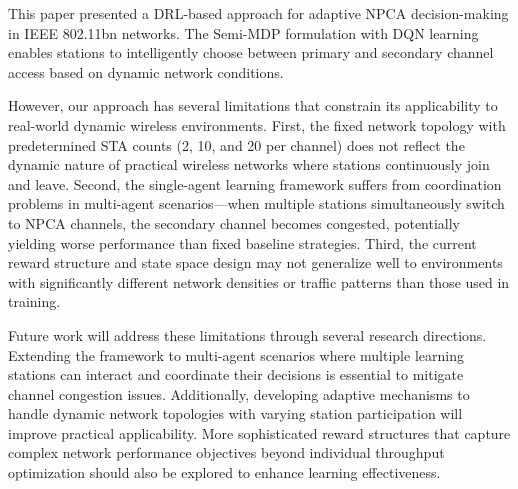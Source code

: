 \documentclass[conference]{IEEEtran}
\begin{document}
This paper presented a DRL-based approach for adaptive NPCA decision-making in IEEE 802.11bn networks. The Semi-MDP formulation with DQN learning enables stations to intelligently choose between primary and secondary channel access based on dynamic network conditions.


However, our approach has several limitations that constrain its applicability to real-world dynamic wireless environments. First, the fixed network topology with predetermined STA counts (2, 10, and 20 per channel) does not reflect the dynamic nature of practical wireless networks where stations continuously join and leave. Second, the single-agent learning framework suffers from coordination problems in multi-agent scenarios—when multiple stations simultaneously switch to NPCA channels, the secondary channel becomes congested, potentially yielding worse performance than fixed baseline strategies. Third, the current reward structure and state space design may not generalize well to environments with significantly different network densities or traffic patterns than those used in training.

Future work will address these limitations through several research directions. Extending the framework to multi-agent scenarios where multiple learning stations can interact and coordinate their decisions is essential to mitigate channel congestion issues. Additionally, developing adaptive mechanisms to handle dynamic network topologies with varying station participation will improve practical applicability. More sophisticated reward structures that capture complex network performance objectives beyond individual throughput optimization should also be explored to enhance learning effectiveness.







\end{document}
